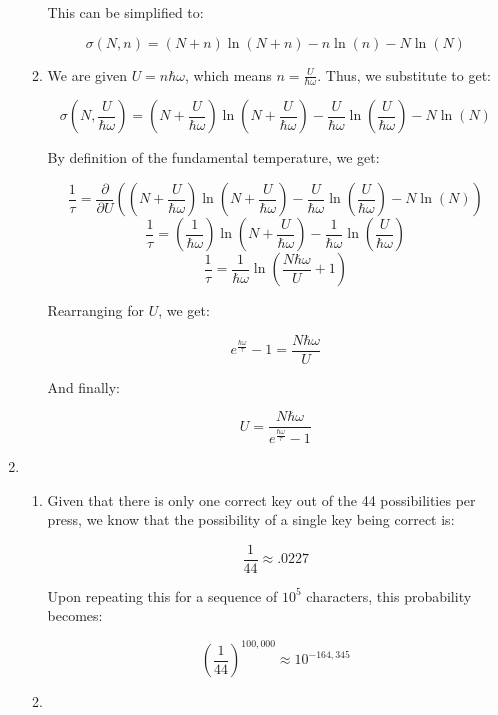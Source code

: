 \begin{enumerate}
\begin{enumerate}
        This can be simplified to:

        $$\boxed{\sigma(N,n)=(N+n)\ln(N+n)-n\ln(n)-N\ln(N)}$$

      \item 

        We are given $U=n\hbar\omega$, which means $n=\frac{U}{\hbar\omega}$. Thus, we substitute to get:

        $$\sigma\left(N,\frac{U}{\hbar\omega}\right)=\left(N+\frac{U}{\hbar\omega}\right)\ln\left( N+\frac{U}{\hbar\omega} \right)-\frac{U}{\hbar\omega}\ln\left( \frac{U}{\hbar\omega} \right)-N\ln(N)$$

        By definition of the fundamental temperature, we get:

        $$\frac{1}{\tau}=\frac{\partial}{\partial U}\left(  \left(N+\frac{U}{\hbar\omega}\right)\ln\left( N+\frac{U}{\hbar\omega} \right)-\frac{U}{\hbar\omega}\ln\left( \frac{U}{\hbar\omega} \right)-N\ln(N)\right)$$
        $$\frac{1}{\tau}=\left( \frac{1}{\hbar\omega}\right)\ln\left( N+\frac{U}{\hbar\omega} \right)-\frac{1}{\hbar\omega}\ln\left( \frac{U}{\hbar\omega} \right)$$
        $$\frac{1}{\tau}=\frac{1}{\hbar\omega}\ln\left( \frac{N\hbar\omega}{U}+1 \right)$$

        Rearranging for $U$, we get:

        $$e^{\frac{\hbar\omega}{\tau}}-1=\frac{N\hbar\omega}{U}$$

        And finally:

        $$\boxed{U=\frac{N\hbar\omega}{e^{\frac{\hbar\omega}{\tau}}-1}}$$

    \end{enumerate}
    
  \item

    \begin{enumerate}

      \item 

        Given that there is only one correct key out of the 44 possibilities per press, we know that the possibility of a single key being correct is:

        $$\frac{1}{44}\approx.0227$$

        Upon repeating this for a sequence of $10^5$ characters, this probability becomes:

        $$\left( \frac{1}{44} \right)^{100,000}\approx 10^{-164,345}$$

      \item 


\end{enumerate}
\end{enumerate}
